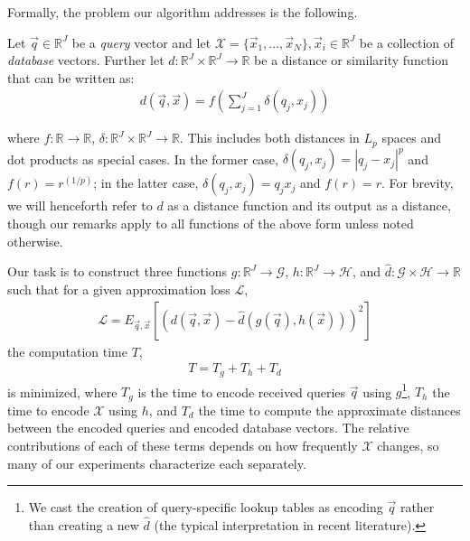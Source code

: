 Formally, the problem our algorithm addresses is the following.

Let $\vec{q} \in \mathbb{R}^J$ be a \textit{query} vector and let $\mathcal{X} = \{\vec{x}_1,\ldots,\vec{x}_N\}, \vec{x}_i \in \mathbb{R}^J$ be a collection of \textit{database} vectors. Further let $d: \mathbb{R}^J \times \mathbb{R}^J \rightarrow \mathbb{R}$ be a distance or similarity function that can be written as:
\begin{align} \label{eq:distFuncForm}
        d(\vec{q}, \vec{x}) = f(\sum_{j=1}^J \delta(q_j, x_j))
\end{align}


where $f: \mathbb{R} \rightarrow \mathbb{R}$, $\delta: \mathbb{R}^J \times \mathbb{R}^J \rightarrow \mathbb{R}$. This includes both distances in $L_p$ spaces and dot products as special cases. In the former case, $\delta(q_j, x_j) = |q_j - x_j|^p$ and $f(r) = r^{(1/p)}$; in the latter case, $\delta(q_j, x_j) = q_j x_j$ and $f(r) = r$. For brevity, we will henceforth refer to $d$ as a distance function and its output as a distance, though our remarks apply to all functions of the above form unless noted otherwise.

Our task is to construct three functions $g: \mathbb{R}^J \rightarrow \mathcal{G}$, $h: \mathbb{R}^J \rightarrow \mathcal{H}$, and $\hat{d}: \mathcal{G} \times \mathcal{H} \rightarrow \mathbb{R}$ such that for a given approximation loss $\mathcal{L}$,
\begin{align}
    \mathcal{L} = E_{\vec{q},\vec{x}}[(d(\vec{q}, \vec{x}) - \hat{d}(g(\vec{q}), h(\vec{x})))^2]
\end{align}
the computation time $T$,
\begin{align}
    T = T_g + T_h + T_d
\end{align}
is minimized, where $T_g$ is the time to encode received queries $\vec{q}$ using $g$\footnote{We cast the creation of query-specific lookup tables as encoding $\vec{q}$ rather than creating a new $\hat{d}$ (the typical interpretation in recent literature).}, $T_h$ the time to encode $\mathcal{X}$ using $h$, and $T_d$ the time to compute the approximate distances between the encoded queries and encoded database vectors. The relative contributions of each of these terms depends on how frequently $\mathcal{X}$ changes, so many of our experiments characterize each separately. %

